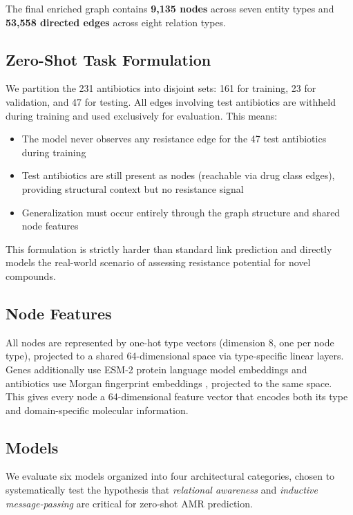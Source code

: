 \documentclass[conference]{IEEEtran}
\begin{document}
The final enriched graph contains \textbf{9,135 nodes} across seven entity types and \textbf{53,558 directed edges} across eight relation types.

\subsection{Zero-Shot Task Formulation}

We partition the 231 antibiotics into disjoint sets: 161 for training, 23 for validation, and 47 for testing. All edges involving test antibiotics are withheld during training and used exclusively for evaluation. This means:
\begin{itemize}
    \item The model never observes any resistance edge for the 47 test antibiotics during training
    \item Test antibiotics are still present as nodes (reachable via drug class edges), providing structural context but no resistance signal
    \item Generalization must occur entirely through the graph structure and shared node features
\end{itemize}

This formulation is strictly harder than standard link prediction and directly models the real-world scenario of assessing resistance potential for novel compounds.

\subsection{Node Features}

All nodes are represented by one-hot type vectors (dimension 8, one per node type), projected to a shared 64-dimensional space via type-specific linear layers. Genes additionally use ESM-2 protein language model embeddings \cite{lin2023esm2} and antibiotics use Morgan fingerprint embeddings \cite{rogers2010morgan}, projected to the same space. This gives every node a 64-dimensional feature vector that encodes both its type and domain-specific molecular information.

\subsection{Models}

We evaluate six models organized into four architectural categories, chosen to systematically test the hypothesis that \textit{relational awareness} and \textit{inductive message-passing} are critical for zero-shot AMR prediction.
\end{document}
